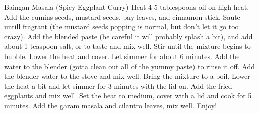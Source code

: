\begin{recipe}[
	]{Baingan Masala (Spicy Eggplant Curry)}
{	\step Heat 4-5 tablespoons oil on high heat. Add the cumins seeds, mustard seeds, bay leaves, and cinnamon stick. Saute untill fragrant (the mustard seeds popping is normal, but don't let it go too crazy). 
	\step Add the blended paste (be careful it will probably splash a bit), and add about 1 teaspoon salt, or to taste and mix well.
	\step Stir until the mixture begins to bubble. Lower the heat and cover. Let simmer for about 6 minutes.
	\step Add the water to the blender (gotta clean out all of the yummy paste) to rinse it off.
	\step Add the blender water to the stove and mix well. Bring the mixture to a boil. Lower the heat a bit and let simmer for 3 minutes with the lid on.
	\step Add the fried eggplants and mix well. Set the heat to medium, cover with a lid and cook for 5 minutes.
	\step Add the garam masala and cilantro leaves, mix well. Enjoy!
}
\end{recipe}
